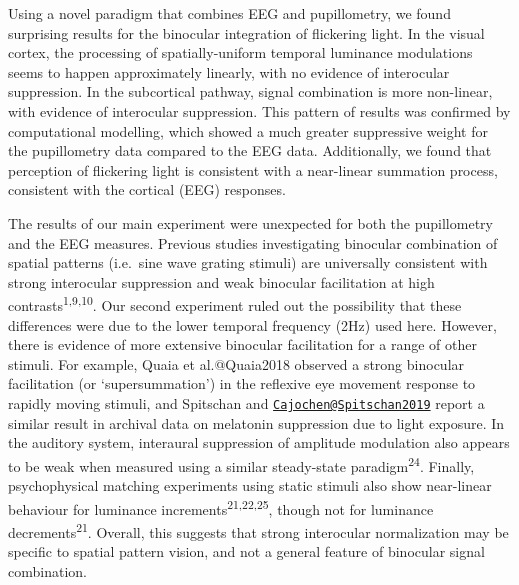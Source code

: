\documentclass[
]{article}
\begin{document}
Using a novel paradigm that combines EEG and pupillometry, we found surprising results for the binocular integration of flickering light. In the visual cortex, the processing of spatially-uniform temporal luminance modulations seems to happen approximately linearly, with no evidence of interocular suppression. In the subcortical pathway, signal combination is more non-linear, with evidence of interocular suppression. This pattern of results was confirmed by computational modelling, which showed a much greater suppressive weight for the pupillometry data compared to the EEG data. Additionally, we found that perception of flickering light is consistent with a near-linear summation process, consistent with the cortical (EEG) responses.

The results of our main experiment were unexpected for both the pupillometry and the EEG measures. Previous studies investigating binocular combination of spatial patterns (i.e.~sine wave grating stimuli) are universally consistent with strong interocular suppression and weak binocular facilitation at high contrasts\textsuperscript{1,9,10}. Our second experiment ruled out the possibility that these differences were due to the lower temporal frequency (2Hz) used here. However, there is evidence of more extensive binocular facilitation for a range of other stimuli. For example, Quaia et al.@Quaia2018 observed a strong binocular facilitation (or `supersummation') in the reflexive eye movement response to rapidly moving stimuli, and Spitschan and \href{mailto:Cajochen@Spitschan2019}{\nolinkurl{Cajochen@Spitschan2019}} report a similar result in archival data on melatonin suppression due to light exposure. In the auditory system, interaural suppression of amplitude modulation also appears to be weak when measured using a similar steady-state paradigm\textsuperscript{24}. Finally, psychophysical matching experiments using static stimuli also show near-linear behaviour for luminance increments\textsuperscript{21,22,25}, though not for luminance decrements\textsuperscript{21}. Overall, this suggests that strong interocular normalization may be specific to spatial pattern vision, and not a general feature of binocular signal combination.
\end{document}
